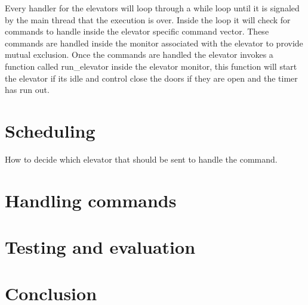 \documentclass[10pt,a4paper]{article}
\begin{document}
Every handler for the elevators will loop through a while loop until it is signaled by the main thread that the execution is over. Inside the loop it will check for commands to handle inside the elevator specific command vector. These commands are handled inside the monitor associated with the elevator to provide mutual exclusion. Once the commands are handled the elevator invokes a function called run\_elevator inside the elevator monitor, this function will start the elevator if its idle and control close the doors if they are open and the timer has run out. 

\section{Scheduling}
How to decide which elevator that should be sent to handle the command.

\section{Handling commands}

\section{Testing and evaluation}

\section{Conclusion}
\end{document}
